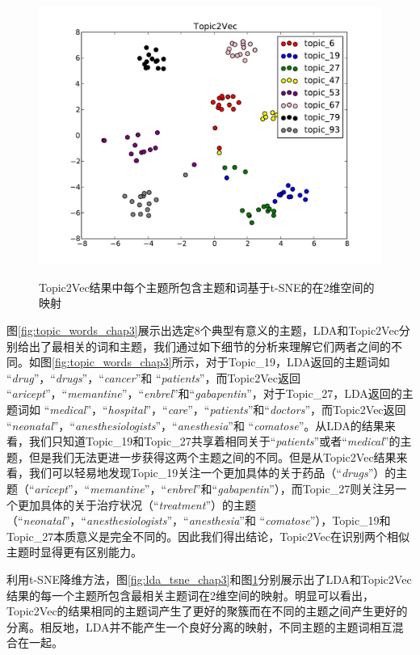 \documentclass[master]{njuthesis}
\begin{document}
\begin{figure}[t]
  \centering
  \includegraphics[width= 1.0\textwidth]{figures//tw_tsne_chap3.pdf}\\
  \caption{Topic2Vec结果中每个主题所包含主题和词基于t-SNE的在2维空间的映射}\label{fig:tw_tsne_chap3}
\end{figure}

图\ref{fig:topic_words_chap3}展示出选定8个典型有意义的主题，LDA和Topic2Vec分别给出了最相关的词和主题，我们通过如下细节的分析来理解它们两者之间的不同。如图\ref{fig:topic_words_chap3}所示，对于Topic\_19，LDA返回的主题词如 ``{\it drug}''，``{\it drugs}''，``{\it cancer}''和 ``{\it patients}''，而Topic2Vec返回 ``{\it aricept}''，``{\it memantine}''，``{\it enbrel}''和``{\it gabapentin}''，对于Topic\_27，LDA返回的主题词如 ``{\it medical}''，``{\it hospital}''，``{\it care}''，``{\it patients}''和``{\it doctors}''，而Topic2Vec返回 ``{\it neonatal}''，``{\it anesthesiologists}''，``{\it anesthesia}''和 ``{\it comatose}''。从LDA的结果来看，我们只知道Topic\_19和Topic\_27共享着相同关于``{\it patients}''或者``{\it medical}''的主题，但是我们无法更进一步获得这两个主题之间的不同。但是从Topic2Vec结果来看，我们可以轻易地发现Topic\_19关注一个更加具体的关于药品（``{\it drugs}''）的主题（``{\it aricept}''，``{\it memantine}''，``{\it enbrel}''和``{\it gabapentin}''），而Topic\_27则关注另一个更加具体的关于治疗状况（``{\it treatment}''）的主题（``{\it neonatal}''，``{\it anesthesiologists}''，``{\it anesthesia}''和 ``{\it comatose}''），Topic\_19和Topic\_27本质意义是完全不同的。因此我们得出结论，Topic2Vec在识别两个相似主题时显得更有区别能力。

利用t-SNE降维方法，图\ref{fig:lda_tsne_chap3}和图\ref{fig:tw_tsne_chap3}分别展示出了LDA和Topic2Vec结果的每一个主题所包含最相关主题词在2维空间的映射。明显可以看出，Topic2Vec的结果相同的主题词产生了更好的聚簇而在不同的主题之间产生更好的分离。相反地，LDA并不能产生一个良好分离的映射，不同主题的主题词相互混合在一起。
\end{document}
